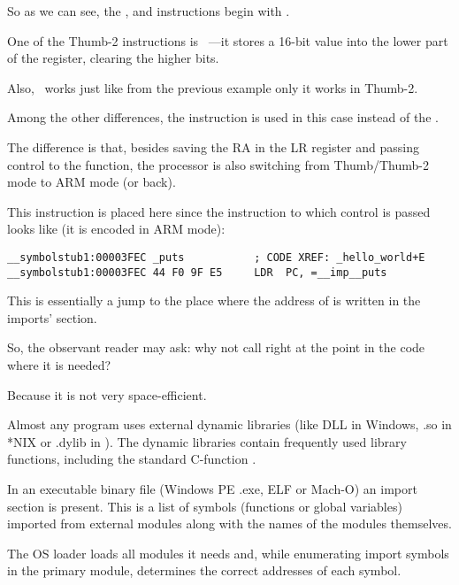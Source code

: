 
So as we can see, the ,  and  instructions begin with .

One of the Thumb-2 instructions is  ~---it stores a 16-bit value into the lower part of the  register, clearing the higher bits.

Also,  ~works just like  from the previous example only it works in Thumb-2.


Among the other differences, the  instruction is used in this case instead of the .

The difference is that, besides saving the \ac{RA} in the \ac{LR} register and passing control 
to the \puts function, the processor is also switching from Thumb/Thumb-2 mode to ARM mode (or back).

This instruction is placed here since the instruction to which control is passed looks like (it is encoded in ARM mode):

\begin{lstlisting}[style=customasmARM]
__symbolstub1:00003FEC _puts           ; CODE XREF: _hello_world+E
__symbolstub1:00003FEC 44 F0 9F E5     LDR  PC, =__imp__puts
\end{lstlisting}

This is essentially a jump to the place where the address of \puts is written in the imports' section.

So, the observant reader may ask: why not call \puts right at the point in the code where it is needed?

Because it is not very space-efficient.

Almost any program uses external dynamic libraries (like DLL in Windows, .so in *NIX or .dylib in \MacOSX).
The dynamic libraries contain frequently used library functions, including the standard C-function \puts.

In an executable binary file (Windows PE .exe, ELF or Mach-O) an import section is present.
This is a list of symbols (functions or global variables) imported from external modules along with the names of the modules themselves.

The \ac{OS} loader loads all modules it needs and, while enumerating import symbols in the primary module, determines the correct addresses of each symbol.

